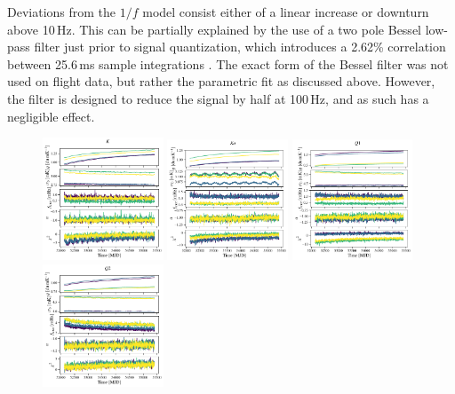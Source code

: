 \documentclass[twocolumn]{../../common/aa}
\begin{document}
Deviations from the $1/f$ model consist either of a linear increase or downturn above 10\,Hz. This can be partially explained by the use of a two pole Bessel low-pass filter just prior to signal quantization, which introduces a 2.62\% correlation between 25.6\,ms sample integrations \citep[][Sect.~5.3]{jarosik2003:MAP}. The exact form of the Bessel filter was not used on flight data, but rather the parametric fit as discussed above. However, the filter is designed to reduce the signal by half at 100\,Hz, and as such has a negligible effect. 


\begin{figure}[p]
  	\centering
	\includegraphics[width=0.32\textwidth]{figures/inst_023-WMAP_K.pdf}
	\includegraphics[width=0.32\textwidth]{figures/inst_030-WMAP_Ka.pdf}
	\includegraphics[width=0.32\textwidth]{figures/inst_040-WMAP_Q1.pdf}\\
	\includegraphics[width=0.32\textwidth]{figures/inst_040-WMAP_Q2.pdf}

\end{figure}
\end{document}
